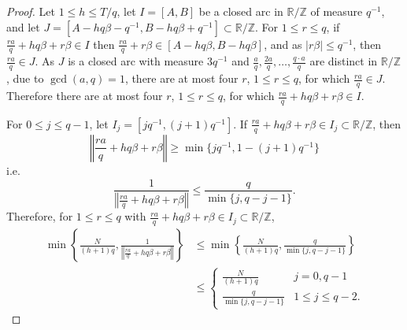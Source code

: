 \documentclass{article}
\newcommand{\norm}[1]{\left\Vert #1 \right\Vert}
\theoremstyle{definition}
\begin{document}
\begin{proof}
Let $1 \leq h \leq T/q$, let $I=[A,B]$ be a closed arc in $\mathbb{R} / \mathbb{Z}$ of measure $q^{-1}$, and
let $J = [A-hq\beta-q^{-1},B-hq\beta+q^{-1}] \subset \mathbb{R} / \mathbb{Z}$.
For $1 \leq r \leq q$, if $\frac{ra}{q}+hq\beta+r\beta \in I$ then $\frac{ra}{q}+r\beta \in [A-hq\beta,B-hq\beta]$, and
as $|r\beta| \leq q^{-1}$, then $\frac{ra}{q} \in J$. As $J$ is a closed arc with measure $3q^{-1}$ and
$\frac{a}{q},\frac{2a}{q},\ldots,\frac{q\cdot a}{q}$ are distinct in $\mathbb{R}/\mathbb{Z}$, due to $\gcd(a,q)=1$, 
there are at most four $r$, $1 \leq r \leq q$, for which $\frac{ra}{q} \in J$. Therefore there are at most
four $r$, $1 \leq r \leq q$, for which $\frac{ra}{q}+hq\beta+r\beta \in I$. 

For $0 \leq j \leq q-1$, let $I_j = [jq^{-1},(j+1)q^{-1}]$. 
If $\frac{ra}{q}+hq\beta+r\beta \in I_j \subset \mathbb{R} / \mathbb{Z}$, then
\[
\norm{\frac{ra}{q}+hq\beta+r\beta} \geq \min\{jq^{-1},1-(j+1)q^{-1}\}
\]
i.e.
\[
\frac{1}{\norm{\frac{ra}{q}+hq\beta+r\beta} } \leq \frac{q}{\min\{j,q-j-1\}}.
\]
Therefore, for $1 \leq r \leq q$ with $\frac{ra}{q}+hq\beta+r\beta \in I_j  \subset \mathbb{R} / \mathbb{Z}$,
\begin{align*}
 \min\left\{\frac{N}{(h+1)q},\frac{1}{\norm{\frac{ra}{q}+hq\beta+r\beta}}\right\} &\leq
\min\left\{\frac{N}{(h+1)q}, \frac{q}{\min\{j,q-j-1\}} \right\}\\
&\leq
\begin{cases}
\frac{N}{(h+1)q}&j=0,q-1\\
\frac{q}{\min\{j,q-j-1\}}&1 \leq j \leq q-2.
\end{cases}
\end{align*}



\end{proof}
\end{document}
